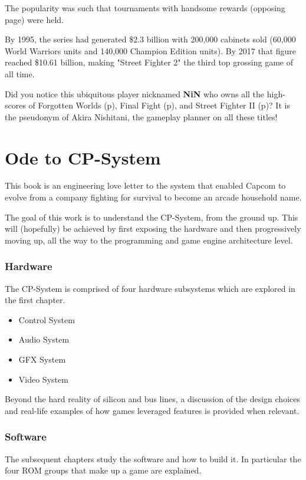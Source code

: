 The popularity was such that tournaments with handsome rewards (opposing page) were held. 

By 1995, the series had generated \$2.3 billion with 200,000 cabinets sold\cite{usgamer20160101} (60,000 World Warriors units and 140,000 Champion Edition units). By 2017 that figure reached \$10.61 billion\cite{gamerevolution20140126}, making "Street Fighter 2" the third top grossing game of all time.

\begin{trivia}
Did you notice this ubiquitous player nicknamed \textbf{NiN} who owns all the high-scores of Forgotten Worlds (p\pageref{nin_fw}), Final Fight (p\pageref{nin_ff}), and Street Fighter II (p\pageref{nin_sf2})? It is the pseudonym of Akira Nishitani, the gameplay planner on all these titles!
\end{trivia}

\section{Ode to CP-System}

This book is an engineering love letter to the system that enabled Capcom to evolve from a company fighting for survival to become an arcade household name.

The goal of this work is to understand the CP-System, from the ground up. This will (hopefully) be achieved by first exposing the hardware and then progressively moving up, all the way to the programming and game engine architecture level.

\subsubsection{Hardware}
The CP-System is comprised of four hardware subsystems which are explored in the first chapter.
\begin{itemize}[topsep=0pt]
\item Control System
\item Audio System
\item GFX System
\item Video System
\end{itemize}
 Beyond the hard reality of silicon and bus lines, a discussion of the design choices and real-life examples of how games leveraged features is provided when relevant.


\subsubsection{Software}
The subsequent chapters study the software and how to build it. In particular the four ROM groups that make up a game are explained. 

